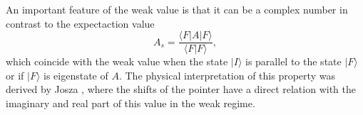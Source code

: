 \documentclass[aps,pra,preprint,superscriptaddress, showpacs]{revtex4-2}
\begin{document}
An important feature of the weak value is that it can be a complex number in contrast to the expectaction value
\begin{equation}\label{strong.value}
A_{s}=\frac{\langle F|A|F\rangle}{\langle F|F\rangle},
\end{equation}
which coincide with the weak value when the state $|I\rangle$ is parallel to the state $|F\rangle$ or if $|F\rangle$ is eigenstate of $A$. The physical interpretation of this property was derived by Josza \cite{jozsa2007complex}, where the shifts of the pointer have a direct relation with the imaginary and real part of this value in the weak regime.


\end{document}
